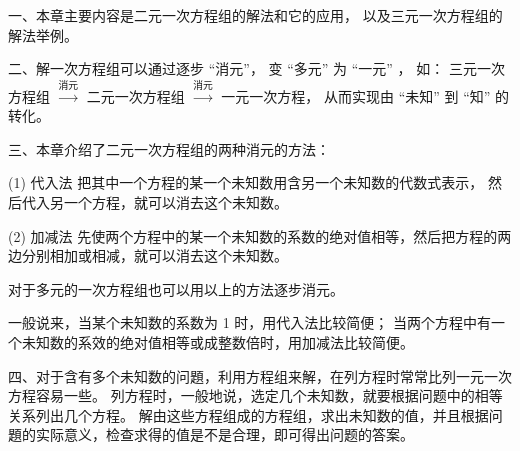 \xiaojie

一、本章主要内容是二元一次方程组的解法和它的应用， 以及三元一次方程组的解法举例。

\jiange
二、解一次方程组可以通过逐步 “消元”， 变 “多元” 为 “一元” ， 如：
\jiange 三元一次方程组 $\xrightarrow{\text{消元}}$ 二元一次方程组 $\xrightarrow{\text{消元}}$ 一元一次方程，
从而实现由 “未知” 到 “知” 的转化。


三、本章介绍了二元一次方程组的两种消元的方法：

(1) 代入法 \quad 把其中一个方程的某一个未知数用含另一个未知数的代数式表示， 然后代入另一个方程，就可以消去这个未知数。

(2) 加减法 \quad 先使两个方程中的某一个未知数的系数的绝对值相等，然后把方程的两边分别相加或相减，就可以消去这个未知数。

对于多元的一次方程组也可以用以上的方法逐步消元。

一般说来，当某个未知数的系数为 1 时，用代入法比较简便； 当两个方程中有一个未知数的系效的绝对值相等或成整数倍时，用加减法比较简便。

四、对于含有多个未知数的问題，利用方程组来解，在列方程时常常比列一元一次方程容易一些。
列方程时，一般地说，选定几个未知数，就要根据问题中的相等关系列出几个方程。
解由这些方程组成的方程组，求出未知数的值，并且根据问題的实际意义，检查求得的值是不是合理，即可得出问题的答案。


